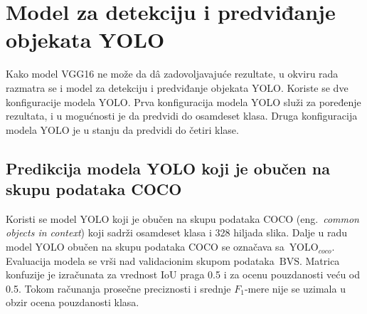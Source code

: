 \documentclass[12pt,oneside]{memoir}
\newcommand{\yolo}{\ensuremath{\,\textrm{YOLO}}}
\newcommand{\bvs}{\ensuremath{\,\textrm{BVS}}}
\begin{document}
\section{Model za detekciju i predviđanje objekata YOLO}

Kako model VGG16 ne može da d\^{a} zadovoljavajuće rezultate, u okviru rada razmatra se i model za detekciju i predviđanje objekata YOLO. Koriste se dve konfiguracije modela YOLO. Prva konfiguracija modela YOLO služi za poređenje rezultata, i u mogućnosti je da predvidi do osamdeset klasa. Druga konfiguracija modela YOLO je u stanju da predvidi do četiri klase.%



\subsection{Predikcija modela YOLO koji je obučen na skupu podataka COCO}

Koristi se model YOLO koji je obučen na skupu podataka COCO (eng.~\textit{common objects in context}) koji sadrži osamdeset klasa i 328 hiljada slika. Dalje u radu model YOLO obučen na skupu podataka COCO se označava sa $\yolo_{coco}$. Evaluacija modela se vrši nad validacionim skupom podataka \bvs{}. Matrica konfuzije je izračunata za vrednost IoU praga 0.5 i za ocenu pouzdanosti veću od 0.5. Tokom računanja prosečne preciznosti i srednje $F_1$-mere nije se uzimala u obzir ocena pouzdanosti klasa. 
\end{document}
